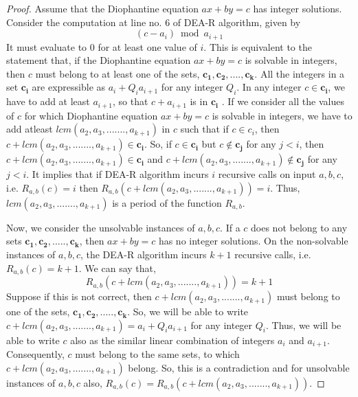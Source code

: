 \documentclass[10pt,a4paper]{amsart}
\begin{document}
\begin{proof}

Assume that the Diophantine equation $ax+by=c$ has integer solutions. Consider the computation at line no. 6 of DEA-R algorithm, given by 
$$
(c-a_i) \bmod a_{i+1}
$$
It must evaluate to 0 for at least one value of $i$. 
This is equivalent to the statement that, if the Diophantine equation $ax+by=c$ is solvable in integers, then $c$ must belong to at least one of the sets, $\mathbf{c_1},\mathbf{c_2},....,\mathbf{c_k}$. All the integers in a set $\mathbf{c_i}$ are expressible as $a_i+Q_ia_{i+1}$ for any integer $Q_i$. In any integer $c\in \mathbf{c_i}$, we have to add at least $a_{i+1}$, so that $c+a_{i+1}$ is in $\mathbf{c_i}$ . If we consider all the values of $c$ for which Diophantine equation $ax+by=c$ is solvable in integers, we have to add atleast $lcm(a_2,a_3,.......,a_{k+1})$ in $c$ such that if $c\in c_i$, then $c+lcm(a_2,a_3,.......,a_{k+1})\in \mathbf{c_i}$. So, if $c \in \mathbf{c_i}$ but $c \notin \mathbf{c_j}$ for any $j<i$, then $c+lcm(a_2,a_3,.......,a_{k+1})\in \mathbf{c_i}$ and $c+lcm(a_2,a_3,.......,a_{k+1})\notin \mathbf{c_j}$ for any $j<i$. It implies that if DEA-R algorithm incurs $i$ recursive calls on input $a,b,c$, i.e. $R_{a,b}(c)=i$ then $R_{a,b}(c+lcm(a_2,a_3,.......,a_{k+1}))=i$.  Thus, $lcm(a_2,a_3,.......,a_{k+1})$ is a period of the function $R_{a,b}$. 
\par Now, we consider the unsolvable instances of $a,b,c$. If a $c$ does not belong to any sets $\mathbf{c_1}, \mathbf{c_2},.....,\mathbf{c_k}$, then $ax+by=c$ has no integer solutions. On the non-solvable instances of $a,b,c$, the DEA-R algorithm incurs $k+1$ recursive calls, i.e. $R_{a,b}(c)=k+1$. We can say that, $$R_{a,b}(c+lcm(a_2,a_3,.......,a_{k+1}))=k+1$$ Suppose if this is not correct, then $c+lcm(a_2,a_3,.......,a_{k+1})$ must belong to one of the sets, $\mathbf{c_1}, \mathbf{c_2},.....,\mathbf{c_k}$. So, we will be able to write $c+lcm(a_2,a_3,.......,a_{k+1})=a_i+Q_ia_{i+1}$ for any integer $Q_i$. Thus, we will be able to write $c$ also as the similar linear combination of integers $a_i$ and $a_{i+1}$. Consequently, $c$ must belong to the same sets, to which  $c+lcm(a_2,a_3,.......,a_{k+1})$ belong. So, this is a contradiction and for unsolvable instances of $a,b,c$ also, $R_{a,b}(c)=R_{a,b}(c+lcm(a_2,a_3,.......,a_{k+1}))$. 

\end{proof}
\end{document}
